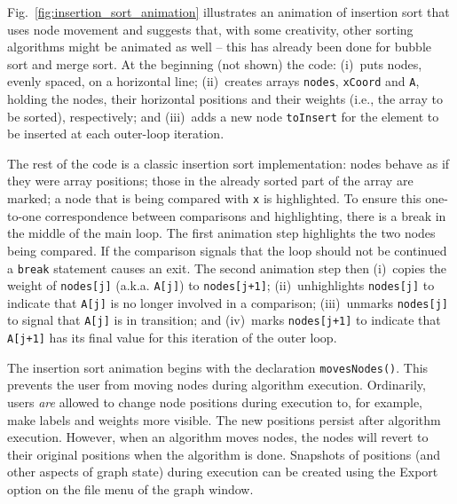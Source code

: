

Fig.~\ref{fig:insertion_sort_animation}
illustrates an animation of insertion sort
that uses node movement and suggests that, with some creativity,
other sorting algorithms might be animated as well
-- this has already been done for bubble sort and merge sort.
At the beginning (not shown) the code:
(i)~puts nodes, evenly spaced, on a horizontal line;
(ii)~creates arrays \verb$nodes$, \verb$xCoord$ and \verb$A$, holding the
nodes, their horizontal positions and their weights (i.e., the array to be sorted), respectively; and (iii)~adds a new node \verb$toInsert$ for the
element to be inserted at each outer-loop iteration.

The rest of the code is a classic insertion sort implementation: nodes behave
as if they were array positions; those in the already sorted part of the array
are marked; a node that is being compared with \verb$x$ is highlighted.
To ensure this one-to-one correspondence between comparisons and highlighting,
there is a break in the middle of the main loop.
The first animation step highlights the two nodes being compared.
If the comparison signals that the loop should not be continued
a \texttt{break} statement causes an exit.
The second animation step then
(i)~copies the weight of \texttt{nodes[j]} (a.k.a. \texttt{A[j]})
to \texttt{nodes[j+1]};
(ii)~unhighlights \texttt{nodes[j]} to indicate that \texttt{A[j]} is no
longer involved in a comparison;
(iii)~unmarks \texttt{nodes[j]} to signal that \texttt{A[j]}
is in transition;
and (iv)~marks \texttt{nodes[j+1]} to indicate that \texttt{A[j+1]}
has its final value for this iteration of the outer loop.

The insertion sort animation begins with the declaration
\verb+movesNodes()+.
This prevents the user from moving nodes during algorithm execution.
Ordinarily, users \emph{are} allowed to change node positions during execution
to, for example, make labels and weights more visible.
The new positions persist after algorithm execution.
However, when an algorithm moves nodes, the nodes will revert to their original
positions when the algorithm is done.
Snapshots of positions (and other aspects of graph state)
during execution can be created using the
\textsf{Export} option on the file menu of the graph window.

